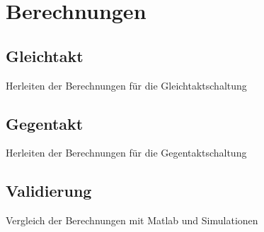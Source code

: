 \section{Berechnungen} \label{sec:berechnungen}
\subsection{Gleichtakt} \label{subsec:berechGleichtakt}
Herleiten der Berechnungen für die Gleichtaktschaltung
\subsection{Gegentakt} \label{subsec:berechGegentakt}
Herleiten der Berechnungen für die Gegentaktschaltung
\subsection{Validierung}\label{subsec:validierung}
Vergleich der Berechnungen mit Matlab und Simulationen